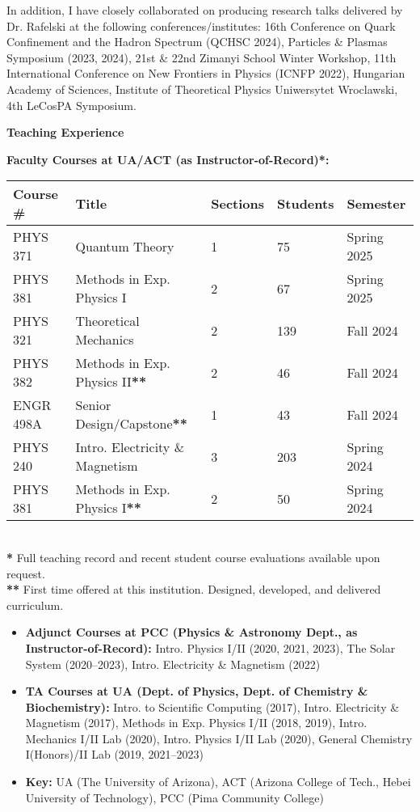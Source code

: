\documentclass[11pt]{article}
\begin{document}
In addition, I have closely collaborated on producing research talks delivered by Dr. Rafelski at the following conferences/institutes: 16th Conference on Quark Confinement and the Hadron Spectrum (QCHSC 2024), Particles \& Plasmas Symposium (2023, 2024), 21st \& 22nd Zimanyi School Winter Workshop, 11th International Conference on New Frontiers in Physics (ICNFP 2022), Hungarian Academy of Sciences, Institute of Theoretical Physics Uniwersytet Wroclawski, 4th LeCosPA Symposium.

{\Large\textbf{Teaching Experience}}

\textbf{Faculty Courses at UA/ACT (as Instructor-of-Record)*:}\\
{\normalsize
\begin{tabular}{@{}p{2.5cm} p{6.5cm} p{2.0cm} p{2.0cm} p{3.0cm}@{}}
    \toprule
    \textbf{Course \#} & \textbf{Title} & \textbf{Sections} & \textbf{Students} & \textbf{Semester} \\
    \midrule
    PHYS 371   & Quantum Theory                    & 1 & 75  & Spring 2025 \\
    PHYS 381   & Methods in Exp. Physics I         & 2 & 67  & Spring 2025 \\
    PHYS 321   & Theoretical Mechanics             & 2 & 139 & Fall 2024 \\
    PHYS 382   & Methods in Exp. Physics II\textbf{**}       & 2 & 46  & Fall 2024 \\
    ENGR 498A  & Senior Design/Capstone\textbf{**}           & 1 & 43  & Fall 2024 \\
    PHYS 240   & Intro. Electricity \& Magnetism    & 3 & 203 & Spring 2024 \\
    PHYS 381   & Methods in Exp. Physics I\textbf{**}        & 2 & 50  & Spring 2024 \\
    \bottomrule
\end{tabular}
}\\[0.0em]

\textbf{*} Full teaching record and recent student course evaluations available upon request.\\[0.0em]
\textbf{**} First time offered at this institution. Designed, developed, and delivered curriculum.

\begin{itemize}[leftmargin=*,nosep]
    \item \textbf{Adjunct Courses at PCC (Physics \& Astronomy Dept., as Instructor-of-Record):} Intro. Physics I/II (2020, 2021, 2023), The Solar System (2020--2023), Intro. Electricity \& Magnetism (2022)
    \item \textbf{TA Courses at UA (Dept. of Physics, Dept. of Chemistry \& Biochemistry):} Intro. to Scientific Computing (2017), Intro. Electricity \& Magnetism (2017), Methods in Exp. Physics I/II (2018, 2019), Intro. Mechanics I/II Lab (2020), Intro. Physics I/II Lab (2020), General Chemistry I(Honors)/II Lab (2019, 2021--2023)
    \item \textbf{Key:} UA (The University of Arizona), ACT (Arizona College of Tech., Hebei University of Technology), PCC (Pima Community College)
\end{itemize}
\end{document}
